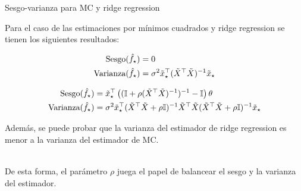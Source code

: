 \documentclass[9pt]{beamer}
\begin{document}
\begin{frame}{Sesgo-varianza para MC y ridge regression}

Para el caso de las estimaciones por mínimos cuadrados y ridge regression se tienen los siguientes resultados:

\begin{theorem}
	\begin{align*}
	\text{Sesgo}(\hat f_\star) &= 0\\
	\text{Varianza}(\hat f_\star) &= \sigma^2 \tilde{x}_\star^\top (\tilde{X}^\top\tilde{X})^{-1}	\tilde{x}_\star
\end{align*}
\end{theorem}\pause
	
\begin{theorem}
	\begin{align*}
	\text{Sesgo}(\hat f_\star) & = \tilde{x}_\star^\top \left(({\mathbb I}+\rho(\tilde{X}^\top\tilde{X})^{-1})^{-1}-{\mathbb I}\right)\theta\\
	\text{Varianza}(\hat f_\star) &= \sigma^2 \tilde{x}_\star^\top (\tilde{X}^\top\tilde{X} + \rho{\mathbb I})^{-1}\tilde{X}^\top\tilde{X}(\tilde{X}^\top\tilde{X}+\rho{\mathbb I})^{-1}	\tilde{x}_\star
\end{align*}

\end{theorem}	\pause
Además, se puede probar que la varianza del estimador de ridge regression es menor a la varianza del estimador de MC.	\\~\ \pause

De esta forma, el parámetro $\rho$ juega el papel de balancear el sesgo y la varianza del estimador.
	
\end{frame}
\end{document}
